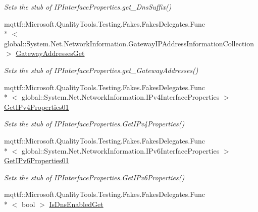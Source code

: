 \begin{DoxyCompactItemize}
\begin{DoxyCompactList}\small\item\em Sets the stub of I\-P\-Interface\-Properties.\-get\-\_\-\-Dns\-Suffix()\end{DoxyCompactList}\item 
mqttf\-::\-Microsoft.\-Quality\-Tools.\-Testing.\-Fakes.\-Fakes\-Delegates.\-Func\\*
$<$ global\-::\-System.\-Net.\-Network\-Information.\-Gateway\-I\-P\-Address\-Information\-Collection $>$ \hyperlink{class_system_1_1_net_1_1_network_information_1_1_fakes_1_1_stub_i_p_interface_properties_a3de7f33ec0bd889156d4d2feea11d690}{Gateway\-Addresses\-Get}
\begin{DoxyCompactList}\small\item\em Sets the stub of I\-P\-Interface\-Properties.\-get\-\_\-\-Gateway\-Addresses()\end{DoxyCompactList}\item 
mqttf\-::\-Microsoft.\-Quality\-Tools.\-Testing.\-Fakes.\-Fakes\-Delegates.\-Func\\*
$<$ global\-::\-System.\-Net.\-Network\-Information.\-I\-Pv4\-Interface\-Properties $>$ \hyperlink{class_system_1_1_net_1_1_network_information_1_1_fakes_1_1_stub_i_p_interface_properties_a04b5fda2ffc4447f8a5ee1781a07ee62}{Get\-I\-Pv4\-Properties01}
\begin{DoxyCompactList}\small\item\em Sets the stub of I\-P\-Interface\-Properties.\-Get\-I\-Pv4\-Properties()\end{DoxyCompactList}\item 
mqttf\-::\-Microsoft.\-Quality\-Tools.\-Testing.\-Fakes.\-Fakes\-Delegates.\-Func\\*
$<$ global\-::\-System.\-Net.\-Network\-Information.\-I\-Pv6\-Interface\-Properties $>$ \hyperlink{class_system_1_1_net_1_1_network_information_1_1_fakes_1_1_stub_i_p_interface_properties_a2dd417e8224938ec6ae7990cc9d4b9c8}{Get\-I\-Pv6\-Properties01}
\begin{DoxyCompactList}\small\item\em Sets the stub of I\-P\-Interface\-Properties.\-Get\-I\-Pv6\-Properties()\end{DoxyCompactList}\item 
mqttf\-::\-Microsoft.\-Quality\-Tools.\-Testing.\-Fakes.\-Fakes\-Delegates.\-Func\\*
$<$ bool $>$ \hyperlink{class_system_1_1_net_1_1_network_information_1_1_fakes_1_1_stub_i_p_interface_properties_a46704fa65f0750341e99728061484681}{Is\-Dns\-Enabled\-Get}

\end{DoxyCompactItemize}
